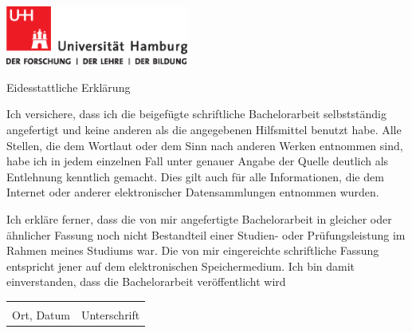 \documentclass{scrreport}
\begin{document}
\includegraphics[width=6cm]{images/up-uhh-logo-u-2010-u-farbe-u-cmyk.eps}\par
\vspace{4\baselineskip}

{\centering \huge Eidesstattliche Erklärung\par}

\vspace{1cm}

Ich versichere, dass ich die beigefügte schriftliche Bachelorarbeit selbstständig angefertigt und keine anderen als die angegebenen Hilfsmittel benutzt habe.
Alle Stellen, die dem Wortlaut oder dem Sinn nach anderen Werken entnommen sind, habe ich in jedem einzelnen Fall unter genauer Angabe der Quelle deutlich als Entlehnung kenntlich gemacht.
Dies gilt auch für alle Informationen, die dem Internet oder anderer elektronischer Datensammlungen entnommen wurden.

Ich erkläre ferner, dass die von mir angefertigte Bachelorarbeit in gleicher oder ähnlicher Fassung noch nicht Bestandteil einer Studien- oder Prüfungsleistung im Rahmen meines Studiums war.
Die von mir eingereichte schriftliche Fassung entspricht jener auf dem elektronischen Speichermedium.
Ich bin damit einverstanden, dass die Bachelorarbeit veröffentlicht wird

\vspace{2cm}

\begin{tabular}{@{}p{5cm}p{8cm}@{}}
    \hrulefill & \hrulefill \\
    Ort, Datum & Unterschrift \\
\end{tabular}
    
\end{document}

